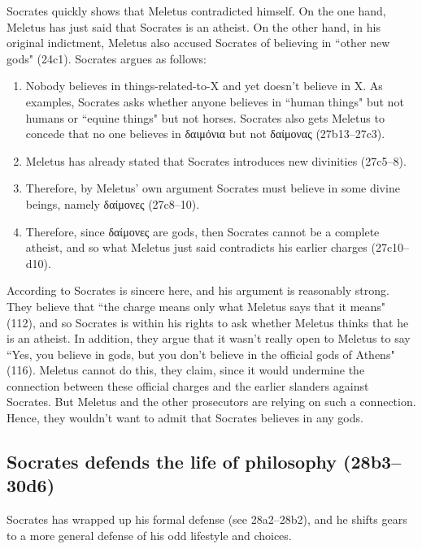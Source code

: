 \documentclass[11pt]{article}
\begin{document}
Socrates quickly shows that Meletus contradicted himself.  On the one hand, Meletus has just said that Socrates is an atheist.  On the other hand, in his original indictment, Meletus also accused Socrates of believing in ``other new gods" (24c1).  Socrates argues as follows:

\begin{enumerate}
    \item Nobody believes in things-related-to-X and yet doesn't believe in X.  As examples, Socrates asks whether anyone believes in ``human things" but not humans or ``equine things" but not horses.  Socrates also gets Meletus to concede that no one believes in δαιμόνια but not δαίμονας (27b13--27c3).
    \item Meletus has already stated that Socrates introduces new divinities (27c5--8).
    \item Therefore, by Meletus' own argument Socrates must believe in some divine beings, namely {\g δαίμονες} (27c8--10).
    \item Therefore, since {\g δαίμονες} are gods, then Socrates cannot be a complete atheist, and so what Meletus just said contradicts his earlier charges (27c10--d10).
\end{enumerate}

According to \citeauthor{brickhouse2004} Socrates is sincere here, and his argument is reasonably strong.  They believe that ``the charge means only what Meletus says that it means" (112), and so Socrates is within his rights to ask whether Meletus thinks that he is an atheist.  In addition, they argue that it wasn't really open to Meletus to say ``Yes, you believe in gods, but you don't believe in the official gods of Athens" (116).  Meletus cannot do this, they claim, since it would undermine the connection between these official charges and the earlier slanders against Socrates.  But Meletus and the other prosecutors are relying on such a connection.  Hence, they wouldn't want to admit that Socrates believes in any gods.


\subsection{Socrates defends the life of philosophy (28b3--30d6)}

Socrates has wrapped up his formal defense (see 28a2--28b2), and he shifts gears to a more general defense of his odd lifestyle and choices.
\end{document}
